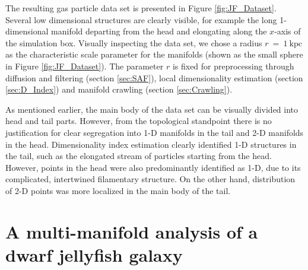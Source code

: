 The resulting gas particle data set is presented in Figure \ref{fig:JF_Dataset}. Several low dimensional structures are clearly visible, for example the long 1-dimensional manifold departing from the head and elongating along the $x$-axis of the simulation box.
Visually inspecting the data set, we chose a radius $r~=~1~\mathrm{kpc}$ as the characteristic scale parameter for the manifolds (shown as the small sphere in Figure \ref{fig:JF_Dataset}).
The parameter $r$ is fixed for preprocessing through diffusion and filtering (section \ref{sec:SAF}), local dimensionality estimation (section \ref{sec:D_Index}) and manifold crawling (section \ref{sec:Crawling}).

As mentioned earlier, the main body of the data set can be visually divided into head and tail parts.
However, from the topological standpoint there is no justification for clear segregation into 1-D manifolds in the tail and 2-D manifolds in the head.
Dimensionality index estimation clearly identified 1-D structures in the tail, such as the elongated stream of particles starting from the head.
However, points in the head were also predominantly identified as 1-D, due to its complicated, intertwined filamentary structure.
On the other hand, distribution of 2-D points was more localized in the main body of the tail.


\section{A multi-manifold analysis of a dwarf jellyfish galaxy}\label{sec:manifold_jellyfish}

